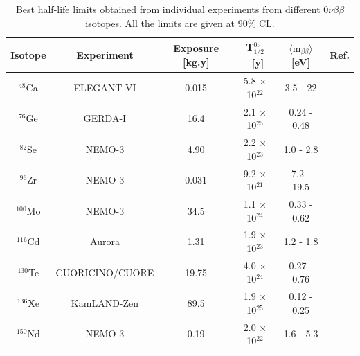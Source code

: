 \documentclass[main.tex]{subfiles}
\begin{document}
\begin{table}[h!]
\centering
\begin{tabular}{cccccc}
\toprule
Isotope & Experiment & Exposure [kg.y]& T$_{\text{1/2}}^{\text{0}\nu}$~[y] & $\langle \text{m}_{\beta\beta} \rangle$ [eV]&  Ref. \\
\midrule
$^{\text{48}}$Ca  & ELEGANT VI       & 0.015 & 5.8 $\times$ 10$^{\text{22}}$ & 3.5 - 22    & \cite{ELEGANTVI}       \\[0.1cm]
$^{\text{76}}$Ge  & GERDA-I          & 16.4  & 2.1 $\times$ 10$^{\text{25}}$ & 0.24 - 0.48 & \cite{GERDA}           \\[0.1cm]
$^{\text{82}}$Se  & NEMO-3           & 4.90  & 2.2 $\times$ 10$^{\text{23}}$ & 1.0 - 2.8   & \cite{ThesisJMott}     \\[0.1cm]
$^{\text{96}}$Zr  & NEMO-3           & 0.031 & 9.2 $\times$ 10$^{\text{21}}$ & 7.2 - 19.5  & \cite{NEMO3:Zr96}      \\[0.1cm]
$^{\text{100}}$Mo & NEMO-3           & 34.5  & 1.1 $\times$ 10$^{\text{24}}$ & 0.33 - 0.62 & \cite{NEMO3:Mo100}     \\[0.1cm]
$^{\text{116}}$Cd & Aurora           & 1.31  & 1.9 $\times$ 10$^{\text{23}}$ & 1.2 - 1.8   & \cite{AuroraRecent}    \\[0.1cm]
$^{\text{130}}$Te & CUORICINO/CUORE  & 19.75 & 4.0 $\times$ 10$^{\text{24}}$ & 0.27 - 0.76 & \cite{CUORE-TeResults} \\[0.1cm]
$^{\text{136}}$Xe & KamLAND-Zen      & 89.5  & 1.9 $\times$ 10$^{\text{25}}$ & 0.12 - 0.25 & \cite{KamLAND-Zen}     \\[0.1cm]
$^{\text{150}}$Nd & NEMO-3           & 0.19  & 2.0 $\times$ 10$^{\text{22}}$ & 1.6 - 5.3   & \cite{NEMO3:Nd150}     \\
\bottomrule
\end{tabular}
\caption{Best half-life limits obtained from individual experiments from different 0$\nu\beta\beta$ isotopes. All the limits are given at 90\% CL.}
\label{tab:summaryBB0NUmeasurements}
\end{table}

\end{document}
